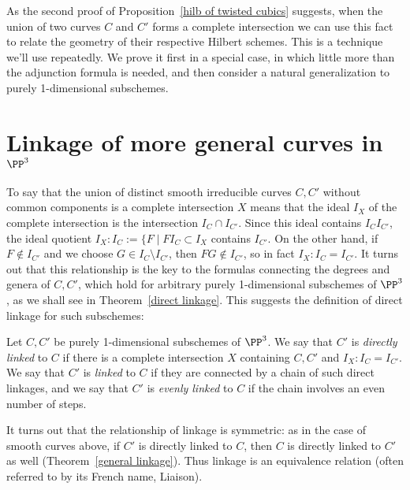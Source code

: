 As the second proof of Proposition~\ref{hilb of twisted cubics} suggests, when the union of two curves $C$ and $C'$ forms a complete intersection we can use this fact to relate the geometry of their respective Hilbert schemes. This is a technique we'll use repeatedly. We prove it first in a special case, in which little more
than the adjunction formula is needed, and then consider a natural
generalization to purely 1-dimensional subschemes.


\section{Linkage of more general curves in $\PP^3$}
To say that the union of distinct smooth irreducible curves $C, C'$ without common components is a complete intersection $X$ means that 
the ideal $I_X$ of the complete intersection is the intersection $I_C\cap I_{C'}$. Since this ideal contains $I_CI_{C'}$, the ideal quotient
$I_X:I_C:= \{F \mid FI_C\subset I_X$
contains $I_{C'}$. On the other hand, if $F \notin I_{C'}$ and we choose $G\in I_C\setminus I_{C'}$, then $FG\notin I_{C'}$, so in fact
$I_X:I_C = I_{C'}$. It turns out that this relationship is the key to the formulas connecting the degrees and genera of $C,C'$, which hold 
for arbitrary purely 1-dimensional subschemes of $\PP^3$, as we shall see in Theorem~\ref{direct linkage}. This suggests the definition
of direct linkage for such subschemes:

\begin{definition}
Let $C,C'$ be purely 1-dimensional subschemes of $\PP^3$. We say that $C'$ is \emph{directly linked} to $C$ if there is a complete
intersection $X$ containing $C,C'$ and $I_X:I_C = I_{C'}$. We say that $C'$ is \emph{linked} to $C$ if they are connected by a chain of such
direct linkages, and we say that $C'$ is \emph{evenly linked} to $C$ if the chain involves an even number of steps.
\end{definition}

It turns out that the relationship of linkage is symmetric: as in the case of smooth curves above, if 
$C'$ is directly linked to $C$, then $C$ is directly linked to $C'$ as well (Theorem~\ref{general linkage}).
Thus
linkage is an equivalence relation (often referred to by its French name, Liaison).


